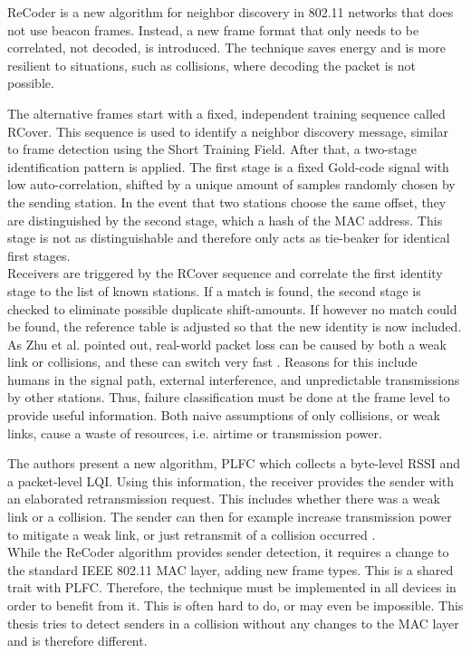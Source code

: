 ReCoder \cite{meng2015} is a new algorithm for neighbor discovery in 802.11 networks that does not use beacon frames. Instead, a new frame format that only needs to be correlated, not decoded, is introduced. The technique saves energy and is more resilient to situations, such as collisions, where decoding the packet is not possible.

The alternative frames start with a fixed, independent training sequence called RCover. This sequence is used to identify a neighbor discovery message, similar to frame detection using the Short Training Field. After that, a two-stage identification pattern is applied. The first stage is a fixed Gold-code signal with low auto-correlation, shifted by a unique amount of samples randomly chosen by the sending station. In the event that two stations choose the same offset, they are distinguished by the second stage, which a hash of the MAC address. This stage is not as distinguishable and therefore only acts as tie-beaker for identical first stages.\\

Receivers are triggered by the RCover sequence and correlate the first identity stage to the list of known stations. If a match is found, the second stage is checked to eliminate possible duplicate shift-amounts. If however no match could be found, the reference table is adjusted so that the new identity is now included.\\

As Zhu et al. pointed out, real-world packet loss can be caused by both a weak link or collisions, and these can switch very fast \cite{zhu2016}. Reasons for this include humans in the signal path, external interference, and unpredictable transmissions by other stations. Thus, failure classification must be done at the frame level to provide useful information. Both naive assumptions of only collisions, or weak links, cause a waste of resources, i.e. airtime or transmission power.

The authors present a new algorithm, \gls{PLFC} which collects a byte-level \gls{RSSI} and a packet-level \gls{LQI}. Using this information, the receiver provides the sender with an elaborated retransmission request. This includes whether there was a weak link or a collision. The sender can then for example increase transmission power to mitigate a weak link, or just retransmit of a collision occurred \cite{zhu2016}.\\

While the ReCoder algorithm provides sender detection, it requires a change to the standard IEEE 802.11 MAC layer, adding new frame types. This is a shared trait with \gls{PLFC}. Therefore, the technique must be implemented in all devices in order to benefit from it. This is often hard to do, or may even be impossible. This thesis tries to detect senders in a collision without any changes to the MAC layer and is therefore different.


